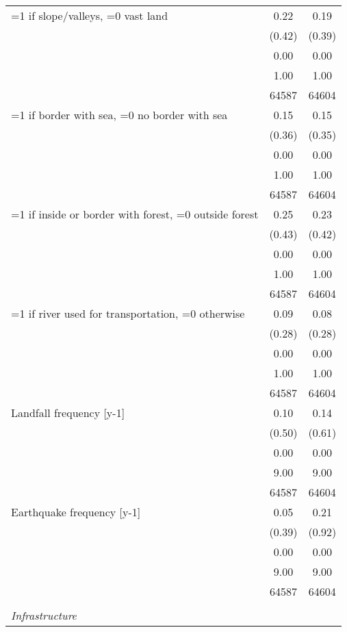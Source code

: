 \begin{tabular}{l*{2}{c}}
=1 if slope/valleys, =0 vast land&     0.22&     0.19\\
                &   (0.42)&   (0.39)\\
                &     0.00&     0.00\\
                &     1.00&     1.00\\
                &    64587&    64604\\
=1 if border with sea, =0 no border with sea&     0.15&     0.15\\
                &   (0.36)&   (0.35)\\
                &     0.00&     0.00\\
                &     1.00&     1.00\\
                &    64587&    64604\\
=1 if inside or border with forest, =0 outside forest&     0.25&     0.23\\
                &   (0.43)&   (0.42)\\
                &     0.00&     0.00\\
                &     1.00&     1.00\\
                &    64587&    64604\\
=1 if river used for transportation, =0 otherwise&     0.09&     0.08\\
                &   (0.28)&   (0.28)\\
                &     0.00&     0.00\\
                &     1.00&     1.00\\
                &    64587&    64604\\
Landfall frequency [y-1]&     0.10&     0.14\\
                &   (0.50)&   (0.61)\\
                &     0.00&     0.00\\
                &     9.00&     9.00\\
                &    64587&    64604\\
Earthquake frequency [y-1]&     0.05&     0.21\\
                &   (0.39)&   (0.92)\\
                &     0.00&     0.00\\
                &     9.00&     9.00\\
                &    64587&    64604\\
\vspace{0.1em} \\ \emph{Infrastructure}&         &         \\

\end{tabular}
